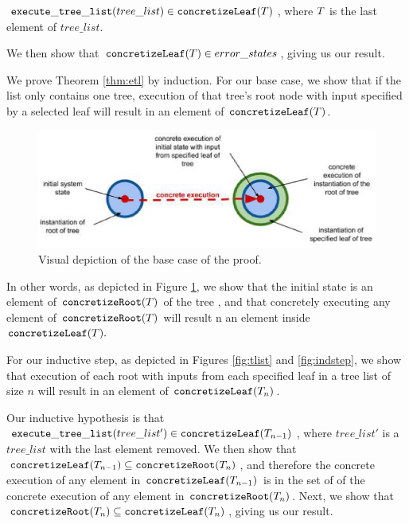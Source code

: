 \begin{theorem}
\label{thm:etl}
 $\mathtt{execute\_tree\_list} (tree\_list) \in \mathtt{concretizeLeaf} (T)$, where $T$ is the last element of $tree\_list$.
\end{theorem}

We then show that $\mathtt{concretizeLeaf} (T) \in error\_states$, giving us our result.

We prove Theorem \ref{thm:etl} by induction. 
For our base case, we show that if the list only contains one tree, execution of that tree's root node with input specified by a selected leaf will result in an element of $\mathtt{concretizeLeaf}(T)$.

\begin{figure}
\centering
\includegraphics[width=.8\textwidth]{set3.eps}
\caption{Visual depiction of the base case of the proof.}
\label{fig:basecase}
\end{figure}

In other words, as depicted in Figure \ref{fig:basecase}, we show that the initial state is an element of $\mathtt{concretizeRoot}(T)$ of the tree \tree, and that concretely executing any element of $\mathtt{concretizeRoot}(T)$ will result n an element inside $\mathtt{concretizeLeaf}(T).$



For our inductive step, as depicted in Figures  \ref{fig:tlist} and \ref{fig:indstep}, we show that execution of each root with inputs from each specified leaf in a tree list of size $n$ will result in an element of $\mathtt{concretizeLeaf}(T_n)$.

Our inductive hypothesis is that $\mathtt{execute\_tree\_list }(tree\_list') \in \mathtt{concretizeLeaf} (T_{n-1})$, where $tree\_list'$ is a $tree\_list$ with the last element removed. We then show that $\mathtt{concretizeLeaf} (T_{n-1}) \subseteq \mathtt{concretizeRoot} (T_{n}) $, and therefore the concrete execution of any element in $\mathtt{concretizeLeaf} (T_{n-1}) $ is in the set of of the concrete execution of any element in $\mathtt{concretizeRoot} (T_{n})$. Next, we show that $\mathtt{concretizeRoot} (T_{n}) \subseteq \mathtt{concretizeLeaf} (T_{n})$, giving us our result.
 

